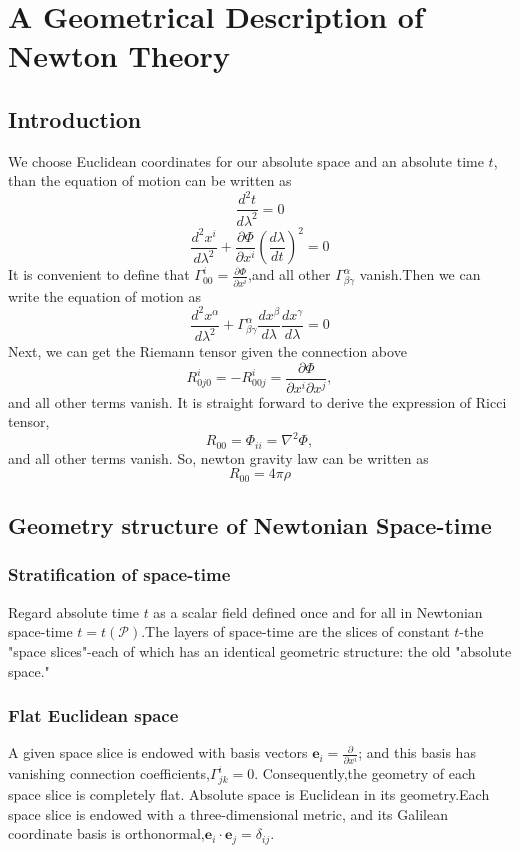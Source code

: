 \documentclass{article}
\begin{document}
\section{A Geometrical Description of Newton Theory}
\subsection{Introduction}
We choose Euclidean coordinates for our absolute space and an absolute time $t$, than the equation of motion can be written as
\[\frac{d^2 t}{d\lambda^2} = 0\]
\[\frac{d^2 x^i}{d\lambda^2} + \frac{\partial \Phi}{\partial x^i} (\frac{d\lambda}{dt})^2=0\]
It is convenient to define that $\Gamma^i_{00} = \frac{\partial \Phi}{\partial x^i}$,and all other $\Gamma^{\alpha}_{\beta \gamma}$ vanish.Then we can write the equation of motion as
\[\frac{d^2 x^{\alpha}}{d\lambda^2} + \Gamma^{\alpha}_{\beta \gamma} \frac{dx^{\beta}}{d \lambda} \frac{dx^{\gamma}}{d \lambda}=0\]
Next, we can get the Riemann tensor given the connection above\[
R^i_{0j0} = -R^i_{00j} = \frac{\partial \Phi}{\partial x^i \partial x^j},
\]and all other terms vanish. It is straight forward to derive the expression of Ricci tensor,
\[R_{00} = \Phi_{ii} = \nabla^2\Phi,\]and all other terms vanish.
So, newton gravity law can be written as
\[R_{00} = 4\pi\rho\]

\subsection{Geometry structure of Newtonian Space-time}
\subsubsection*{Stratification of space-time}
Regard absolute time $t$ as a scalar field defined once and for all in Newtonian space-time $t=t(\mathcal{P})$.The layers of space-time are the slices of constant $t$-the "space slices"-each of which has an identical geometric structure: the old "absolute space."
\subsubsection*{Flat Euclidean space}
A given space slice is endowed with basis vectors $\mathbf{e}_i = \frac{\partial}{\partial x^i}$; and this basis has vanishing connection coefficients,$\Gamma^i_{jk} = 0$. Consequently,the geometry of each space slice is completely flat. Absolute space is Euclidean in its geometry.Each space slice is endowed with a three-dimensional metric, and its Galilean coordinate basis is orthonormal,$\mathbf{e}_i \cdot \mathbf{e}_j = \delta_{ij}$.
\end{document}
